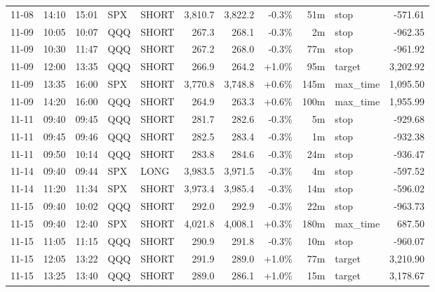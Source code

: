 \documentclass[11pt,a4paper,twoside]{article}
\begin{document}
\begin{center}
\begin{longtable}{>{\color{txtmain}}l l l l l r r r r >{\color{txtmain}}l r}
11-08 & 14:10 & 15:01 & SPX & SHORT & 3,810.7 & 3,822.2 & \textcolor{lossred}{-0.3\%} & 51m & stop & \textcolor{lossred}{-571.61} \\
11-09 & 10:05 & 10:07 & QQQ & SHORT & 267.3 & 268.1 & \textcolor{lossred}{-0.3\%} & 2m & stop & \textcolor{lossred}{-962.35} \\
11-09 & 10:30 & 11:47 & QQQ & SHORT & 267.2 & 268.0 & \textcolor{lossred}{-0.3\%} & 77m & stop & \textcolor{lossred}{-961.92} \\
11-09 & 12:00 & 13:35 & QQQ & SHORT & 266.9 & 264.2 & \textcolor{wingreen}{+1.0\%} & 95m & target & \textcolor{wingreen}{3,202.92} \\
11-09 & 13:35 & 16:00 & SPX & SHORT & 3,770.8 & 3,748.8 & \textcolor{wingreen}{+0.6\%} & 145m & max\_time & \textcolor{wingreen}{1,095.50} \\
11-09 & 14:20 & 16:00 & QQQ & SHORT & 264.9 & 263.3 & \textcolor{wingreen}{+0.6\%} & 100m & max\_time & \textcolor{wingreen}{1,955.99} \\
11-11 & 09:40 & 09:45 & QQQ & SHORT & 281.7 & 282.6 & \textcolor{lossred}{-0.3\%} & 5m & stop & \textcolor{lossred}{-929.68} \\
11-11 & 09:45 & 09:46 & QQQ & SHORT & 282.5 & 283.4 & \textcolor{lossred}{-0.3\%} & 1m & stop & \textcolor{lossred}{-932.38} \\
11-11 & 09:50 & 10:14 & QQQ & SHORT & 283.8 & 284.6 & \textcolor{lossred}{-0.3\%} & 24m & stop & \textcolor{lossred}{-936.47} \\
11-14 & 09:40 & 09:44 & SPX & LONG & 3,983.5 & 3,971.5 & \textcolor{lossred}{-0.3\%} & 4m & stop & \textcolor{lossred}{-597.52} \\
11-14 & 11:20 & 11:34 & SPX & SHORT & 3,973.4 & 3,985.4 & \textcolor{lossred}{-0.3\%} & 14m & stop & \textcolor{lossred}{-596.02} \\
11-15 & 09:40 & 10:02 & QQQ & SHORT & 292.0 & 292.9 & \textcolor{lossred}{-0.3\%} & 22m & stop & \textcolor{lossred}{-963.73} \\
11-15 & 09:40 & 12:40 & SPX & SHORT & 4,021.8 & 4,008.1 & \textcolor{wingreen}{+0.3\%} & 180m & max\_time & \textcolor{wingreen}{687.50} \\
11-15 & 11:05 & 11:15 & QQQ & SHORT & 290.9 & 291.8 & \textcolor{lossred}{-0.3\%} & 10m & stop & \textcolor{lossred}{-960.07} \\
11-15 & 12:05 & 13:22 & QQQ & SHORT & 291.9 & 289.0 & \textcolor{wingreen}{+1.0\%} & 77m & target & \textcolor{wingreen}{3,210.90} \\
11-15 & 13:25 & 13:40 & QQQ & SHORT & 289.0 & 286.1 & \textcolor{wingreen}{+1.0\%} & 15m & target & \textcolor{wingreen}{3,178.67} \\

\end{longtable}
\end{center}
\end{document}
